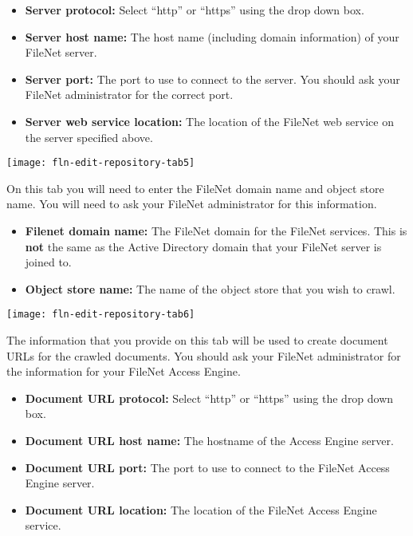 \begin{itemize}

\item \textbf{Server protocol:} Select ``http'' or ``https'' using the drop down box. 

\item \textbf{Server host name:} The host name (including domain information) of your FileNet server.

\item \textbf{Server port:} The port to use to connect to the server. You should ask your FileNet administrator for the correct port.

\item \textbf{Server web service location:} The location of the FileNet web service on the server specified above.

\end{itemize}

\texttt{[image: fln-edit-repository-tab5]}

On this tab you will need to enter the FileNet domain name and object
store name. You will need to ask your FileNet administrator for this
information.

\begin{itemize}

\item \textbf{Filenet domain name:} The FileNet domain for the FileNet services. This is \textbf{not} the same as the Active Directory domain that your FileNet server is joined to.

\item \textbf{Object store name:} The name of the object store that you wish to crawl.

\end{itemize}

\texttt{[image: fln-edit-repository-tab6]}

The information that you provide on this tab will be used to create
document URLs for the crawled documents. You should ask your FileNet
administrator for the information for your FileNet Access Engine.

\begin{itemize}

\item \textbf{Document URL protocol:} Select ``http'' or ``https'' using the drop down box. 

\item \textbf{Document URL host name:} The hostname of the Access Engine server.

\item \textbf{Document URL port:} The port to use to connect to the FileNet Access Engine server.

\item \textbf{Document URL location:} The location of the FileNet Access Engine service.

\end{itemize}

